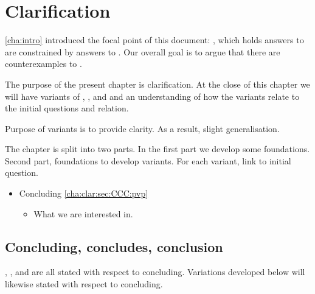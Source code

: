 \chapter{Clarification}
\label{cha:clar}

\begin{note}
  \autoref{cha:intro} introduced the focal point of this document:
  \issueInclusion{}, which holds answers to \qWhy{} are constrained by answers to \qHow{}.
  Our overall goal is to argue that there are counterexamples to \issueInclusion{}.

  The purpose of the present chapter is clarification.
  At the close of this chapter we will have variants of \qWhy{}, \qHow{}, and \issueInclusion{} and an understanding of how the variants relate to the initial questions and relation.

  Purpose of variants is to provide clarity.
  As a result, slight generalisation.
\end{note}

\begin{note}
  The chapter is split into two parts.
  In the first part we develop some foundations.
  Second part, foundations to develop variants.
  For each variant, link to initial question.

  \begin{itemize}
  \item
    Concluding \hfill \autoref{cha:clar:sec:CCC:pvp}
    \begin{itemize}
    \item
      What we are interested in.
    \end{itemize}
  \end{itemize}
\end{note}

\section{Concluding, concludes, conclusion}
\label{cha:clar:sec:CCC}

\begin{note}
  \qWhy{}, \qHow{}, and \issueInclusion{} are all stated with respect to concluding.
  Variations developed below will likewise stated with respect to concluding.
\end{note}

